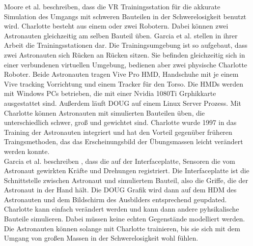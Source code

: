 Moore et al. beschreiben, dass die VR Trainingsstation für die akkurate Simulation des Umgangs mit schweren Bauteilen in der Schwerelosigkeit benutzt wird.\cite{moore201021st}
Charlotte besteht aus einem oder zwei Robotern. Dabei können zwei Astronauten gleichzeitig am selben Bauteil üben.\cite{miralles2013onboard}
Garcia et al. stellen in ihrer Arbeit die Trainingsstationen dar.
Die Trainingsumgebung ist so aufgebaut, dass zwei Astronauten sich Rücken an Rücken sitzen. Sie befinden gleichzeitig sich in einer verbundenen virtuellen Umgebung, bedienen aber zwei physische Charlotte Roboter.
Beide Astronauten tragen Vive Pro HMD, Handschuhe mit je einem Vive tracking Vorrichtung und einem Tracker für den Torso.
Die HMDs werden mit Windows PCs betrieben, die mit einer Nvidia 1080Ti Grphikkarte ausgestattet sind.
Außerdem läuft DOUG auf einem Linux Server Prozess. \cite{garcia2020training}
Mit Charlotte können Astronauten mit simulierten Bauteilen üben, die unterschiedlich schwer, groß und gewichtet sind. \cite{miralles2013onboard}
Charlotte wurde 1997 in das Training der Astronauten integriert und hat den Vorteil gegenüber früheren Traingsmethoden, das das Erscheinungsbild der Übungsmassen leicht verändert werden konnte. \cite{garcia2020training}
\\
Garcia et al. beschreiben , dass die auf der Interfaceplatte, Sensoren die vom Astronaut gewirkten Kräfte und Drehungen registriert.
Die Interfaceplatte ist die Schnittstelle zwischen Astronaut und simuliertem Bauteil, also die Griffe, die der Astronaut in der Hand hält.
Die DOUG Grafik wird dann auf dem HDM des Astronauten und dem Bildschirm des Ausbilders entsprechend geupdated. \cite{garcia2020training}
\\
Charlotte kann einfach verändert werden und kann dann andere pyhsikalische Bauteile simulieren.
Dabei müssen keine echten Gegenstände modelliert werden. \cite{garcia2020training}
Die Astronauten können solange mit Charlotte trainieren, bis sie sich mit dem Umgang von großen Massen in der Schwerelosigkeit wohl fühlen.\cite{garcia2020training}
